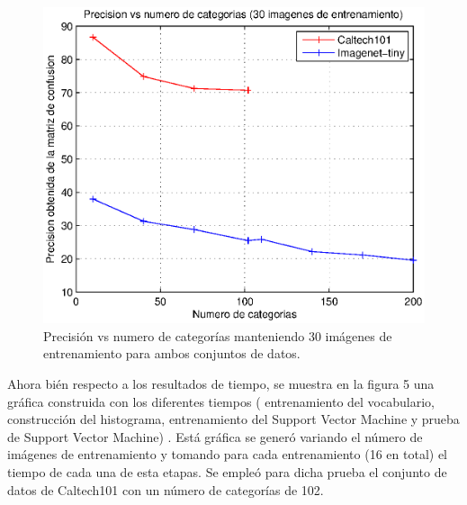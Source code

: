 \documentclass[10pt,twocolumn,letterpaper]{article}
\begin{document}
\begin{figure}[t]
\begin{center}
   \includegraphics[width=1\linewidth]{cat.eps}
\end{center}
   \caption{Precisión vs numero de categorías manteniendo 30 imágenes de entrenamiento para ambos conjuntos de datos.}
\label{fig:seg}
\end{figure}

Ahora bién respecto a los resultados de tiempo, se muestra en la figura 5 una gráfica construida con los diferentes tiempos ( entrenamiento del vocabulario, construcción del histograma, entrenamiento del Support Vector Machine y prueba de Support Vector Machine) . Está gráfica se generó variando el número de imágenes de entrenamiento y tomando para cada entrenamiento (16 en total) el tiempo de cada una de esta etapas. Se empleó para dicha prueba el conjunto de datos de Caltech101 con un número de categorías de 102.
\end{document}
